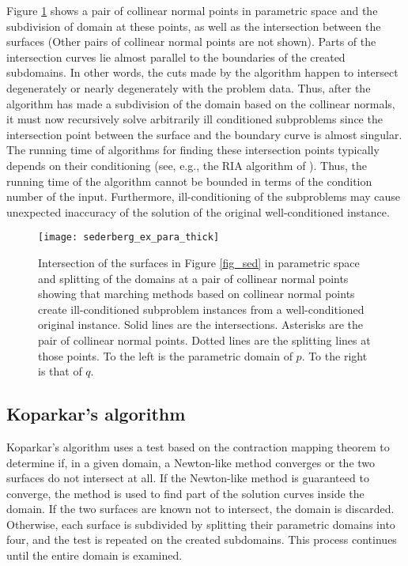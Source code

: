 \documentclass{article}
\begin{document}
Figure \ref{fig_sed_para} shows a pair of collinear normal points in
parametric space and the subdivision of domain at these points, as
well as the intersection between the surfaces (Other pairs of
collinear normal points are not shown).  Parts of the intersection
curves lie almost parallel to the boundaries of the created
subdomains.  In other words, the cuts made by the algorithm happen to
intersect degenerately or nearly degenerately with the problem data.
Thus, after the algorithm has made a subdivision of the domain
based on the collinear normals,
it must now recursively solve
arbitrarily ill conditioned subproblems since the
intersection point between the surface and the boundary curve is
almost singular. The running time of algorithms for finding these
intersection points typically depends on their conditioning
(see, e.g., the RIA algorithm of \cite{patrikalakis}).
Thus, the running time of the algorithm cannot be
bounded in terms of the condition number of the input.  
Furthermore, ill-conditioning of the
subproblems may cause unexpected inaccuracy of the solution of the
original well-conditioned instance.

\begin{figure}
\centering
\texttt{[image: sederberg\_ex\_para\_thick]}
\caption{Intersection of the surfaces in Figure \ref{fig_sed} in parametric space and splitting of the domains at a pair of collinear normal points showing that marching methods based on collinear normal points create ill-conditioned subproblem instances from a well-conditioned original instance.  Solid lines are the intersections. Asterisks are the pair of collinear normal points.  Dotted lines are the splitting lines at those points. To the left is the parametric domain of $p$.  To the right is that of $q$.}
\label{fig_sed_para}
\end{figure}

\subsection{Koparkar's algorithm}
\label{section_koparkar_cond}

Koparkar's algorithm uses a test based on the contraction mapping theorem
to determine if, in a given domain, a Newton-like method converges or
the two surfaces do not intersect at all.  If the Newton-like method
is guaranteed to converge, the method is used to find part of the
solution curves inside the domain.  If the two surfaces are known 
not to intersect, the domain is discarded.  Otherwise, each surface is
subdivided by splitting their parametric domains into four, 
and the test is repeated on the created subdomains.
This process continues until the entire domain is examined.
\end{document}
